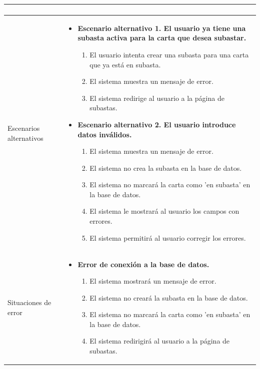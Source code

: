 \begin{longtable}{
    >{\columncolor{lightgreen!20}}p{4cm}
    p{12cm}
    }
\begin{enumerate}[nosep,leftmargin=*]
    \end{enumerate} \\
    \midrule
    Escenarios alternativos & 
    \begin{itemize}[nosep,leftmargin=*]
        \item \textbf{Escenario alternativo 1. El usuario ya tiene una subasta activa para la carta que desea subastar.}
        \begin{enumerate}[nosep,leftmargin=*]
            \item El usuario intenta crear una subasta para una carta que ya está en subasta.
            \item El sistema muestra un mensaje de error.
            \item El sistema redirige al usuario a la página de subastas.
        \end{enumerate}
        \item \textbf{Escenario alternativo 2. El usuario introduce datos inválidos.}
        \begin{enumerate}[nosep,leftmargin=*]
            \item El sistema muestra un mensaje de error.
            \item El sistema no crea la subasta en la base de datos.
            \item El sistema no marcará la carta como 'en subasta' en la base de datos.
            \item El sistema le mostrará al usuario los campos con errores.
            \item El sistema permitirá al usuario corregir los errores.
        \end{enumerate}
    \end{itemize} \\
    \midrule
    Situaciones de error & 
    \begin{itemize}[nosep,leftmargin=*]
        \item \textbf{Error de conexión a la base de datos.}
        \begin{enumerate}[nosep,leftmargin=*]
            \item El sistema mostrará un mensaje de error.
            \item El sistema no creará la subasta en la base de datos.
            \item El sistema no marcará la carta como 'en subasta' en la base de datos.
            \item El sistema redirigirá al usuario a la página de subastas.
        \end{enumerate}
    \end{itemize} \\
\end{longtable}




